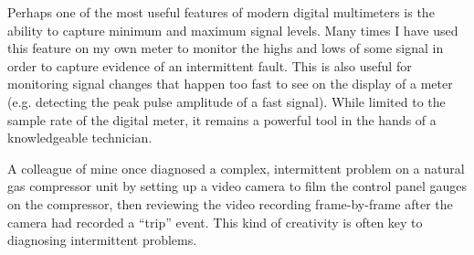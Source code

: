Perhaps one of the most useful features of modern digital multimeters is the ability to capture minimum and maximum signal levels.  Many times I have used this feature on my own meter to monitor the highs and lows of some signal in order to capture evidence of an intermittent fault.  This is also useful for monitoring signal changes that happen too fast to see on the display of a meter (e.g. detecting the peak pulse amplitude of a fast signal).  While limited to the sample rate of the digital meter, it remains a powerful tool in the hands of a knowledgeable technician.

A colleague of mine once diagnosed a complex, intermittent problem on a natural gas compressor unit by setting up a video camera to film the control panel gauges on the compressor, then reviewing the video recording frame-by-frame after the camera had recorded a ``trip'' event.  This kind of creativity is often key to diagnosing intermittent problems.


















